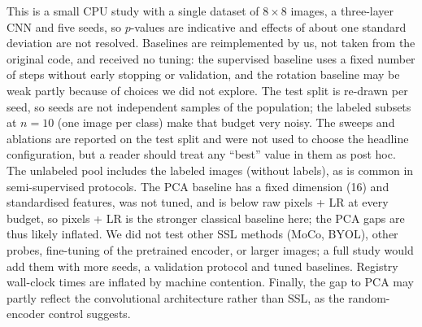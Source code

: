 This is a small CPU study with a single dataset of $8\times8$ images, a three-layer CNN and five seeds, so $p$-values are indicative and effects of about one standard deviation are not resolved. Baselines are reimplemented by us, not taken from the original code, and received no tuning: the supervised baseline uses a fixed number of steps without early stopping or validation, and the rotation baseline may be weak partly because of choices we did not explore. The test split is re-drawn per seed, so seeds are not independent samples of the population; the labeled subsets at $n=10$ (one image per class) make that budget very noisy. The sweeps and ablations are reported on the test split and were not used to choose the headline configuration, but a reader should treat any ``best'' value in them as post hoc. The unlabeled pool includes the labeled images (without labels), as is common in semi-supervised protocols. The PCA baseline has a fixed dimension (16) and standardised features, was not tuned, and is below raw pixels + LR at every budget, so pixels + LR is the stronger classical baseline here; the PCA gaps are thus likely inflated. We did not test other SSL methods (MoCo, BYOL), other probes, fine-tuning of the pretrained encoder, or larger images; a full study would add them with more seeds, a validation protocol and tuned baselines. Registry wall-clock times are inflated by machine contention. Finally, the gap to PCA may partly reflect the convolutional architecture rather than SSL, as the random-encoder control suggests.
